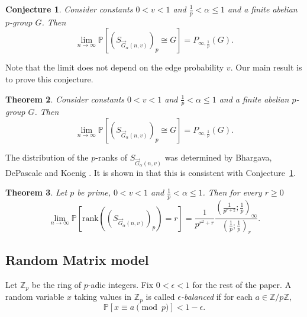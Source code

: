 \documentclass[12pt]{amsart}
\newtheorem{theorem}{Theorem}[section]
\newtheorem{conjecture}[theorem]{Conjecture}
\theoremstyle{definition}
\newcommand{\PPP}{\mathbb{P}}
\newcommand{\PPb}[1]{\PPP\left[#1\right]}
\newcommand{\qpochn}[3]{\left(#1;#2\right)_{#3}}
\newcommand{\Z}{\mathbb{Z}}
\newcommand{\rank}{\text{rank}}
\begin{document}
\begin{conjecture}\cite{bhargava2023rank}\label{Conj: directed bipartite graph}
Consider constants $0<v<1$ and $ \frac{1}{p}<\alpha \leq 1$ and a finite abelian $p$-group $G$.
Then
\[
\lim_{n \rightarrow \infty} 
\PPb{(S_{\vec G_{\alpha}(n,v)})_p \cong G} 
=P_{\infty,\frac{1}{p}}(G).
\]
\end{conjecture}

Note that the limit does not depend on the edge probability $v$. 
Our main result is to prove this conjecture.

\begin{theorem}\label{Thm: dist directed bipartite graph}
Consider constants $0<v<1$ and $ \frac{1}{p}<\alpha\leq 1$ and a finite abelian $p$-group $G$.
Then
\[
\lim_{n \rightarrow \infty} 
\PPb{(S_{\vec G_{\alpha}(n,v)})_p \cong G} 
=P_{\infty,\frac{1}{p}}(G).
\]  
\end{theorem}


The distribution of the $p$-ranks of $S_{\vec G_{\alpha}(n,v)}$ was determined by Bhargava, DePascale and Koenig \cite{bhargava2023rank}. It is shown in \cite{FulmanKaplanSinghalWarnaar_SylowSandpileBipartite} that this is consistent with Conjecture~\ref{Conj: directed bipartite graph}.

\begin{theorem}
Let $p$ be prime, $0<v<1$ and $ \frac{1}{p}<\alpha \leq 1$.
Then for every $r\geq 0$
\[
\lim_{n \rightarrow \infty} 
\PPb{\rank((S_{\vec G_{\alpha}(n,v)})_p) =r}
=\frac{1}{p^{r^2+r}} 
\frac{\qpochn{\frac{1}{p^{r+2}}}{\frac{1}{p}}{\infty}}{\qpochn{\frac{1}{p}}{\frac{1}{p}}{r}}.
\]
\end{theorem}















\subsection{Random Matrix model}


Let $\Z_p$ be the ring of $p$-adic integers. Fix $0<\epsilon<1$ for the rest of the paper.
A random variable $x$ taking values in $\Z_p$ is called \emph{$\epsilon$-balanced} if for each $a\in \Z/p\Z$,
\[
\PPP[x\equiv a\pmod{p}]<1-\epsilon.
\]
\end{document}
